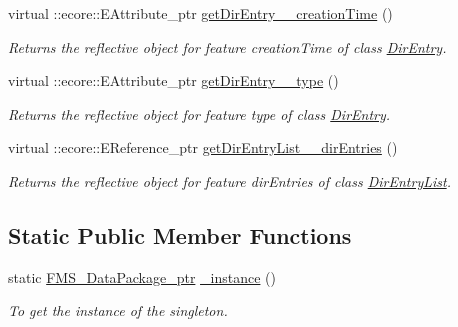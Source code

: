 \begin{DoxyCompactItemize}
virtual ::ecore::EAttribute\_\-ptr \hyperlink{classFMS__Data_1_1FMS__DataPackage_a2ed74864c36f0b72ee42b19d12794fcc}{getDirEntry\_\-\_\-creationTime} ()
\begin{DoxyCompactList}\small\item\em Returns the reflective object for feature creationTime of class \hyperlink{classFMS__Data_1_1DirEntry}{DirEntry}. \item\end{DoxyCompactList}\item 
virtual ::ecore::EAttribute\_\-ptr \hyperlink{classFMS__Data_1_1FMS__DataPackage_acd3ffeaeed2d632da1e03e869403eeeb}{getDirEntry\_\-\_\-type} ()
\begin{DoxyCompactList}\small\item\em Returns the reflective object for feature type of class \hyperlink{classFMS__Data_1_1DirEntry}{DirEntry}. \item\end{DoxyCompactList}\item 
virtual ::ecore::EReference\_\-ptr \hyperlink{classFMS__Data_1_1FMS__DataPackage_a7306920f4093112aa5b038d603cebc6e}{getDirEntryList\_\-\_\-dirEntries} ()
\begin{DoxyCompactList}\small\item\em Returns the reflective object for feature dirEntries of class \hyperlink{classFMS__Data_1_1DirEntryList}{DirEntryList}. \item\end{DoxyCompactList}\end{DoxyCompactItemize}
\subsection*{Static Public Member Functions}
\begin{DoxyCompactItemize}
\item 
static \hyperlink{classFMS__Data_1_1FMS__DataPackage}{FMS\_\-DataPackage\_\-ptr} \hyperlink{classFMS__Data_1_1FMS__DataPackage_a4dfeba51021105a1c0530db8a0a80e5c}{\_\-instance} ()
\begin{DoxyCompactList}\small\item\em To get the instance of the singleton. \item\end{DoxyCompactList}\end{DoxyCompactItemize}
